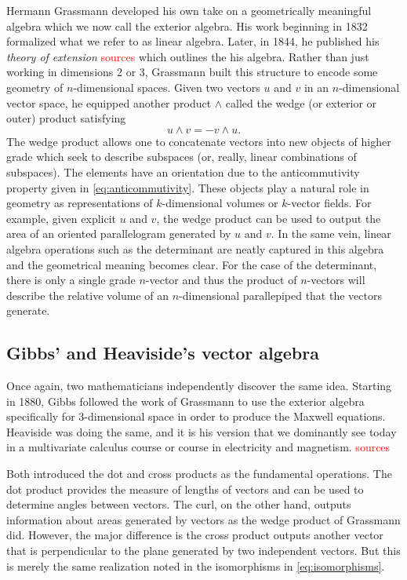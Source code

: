 \documentclass[12pt]{article}
\begin{document}
Hermann Grassmann developed his own take on a geometrically meaningful algebra which we now call the exterior algebra. His work beginning in 1832 formalized what we refer to as linear algebra. Later, in 1844, he published his \emph{theory of extension} \textcolor{red}{sources} which outlines the his algebra. Rather than just working in dimensions 2 or 3, Grassmann built this structure to encode some geometry of $n$-dimensional spaces. Given two vectors $u$ and $v$ in an $n$-dimensional vector space, he equipped another product $\wedge$ called the wedge (or exterior or outer) product satisfying
\begin{equation}
\label{eq:anticommutivity}
u \wedge v = - v \wedge u.
\end{equation}
The wedge product allows one to concatenate vectors into new objects of higher grade which seek to describe subspaces (or, really, linear combinations of subspaces). The elements have an orientation due to the anticommutivity property given in \cref{eq:anticommutivity}. These objects play a natural role in geometry as representations of $k$-dimensional volumes or $k$-vector fields. For example, given explicit $u$ and $v$, the wedge product can be used to output the area of an oriented parallelogram generated by $u$ and $v$. In the same vein, linear algebra operations such as the determinant are neatly captured in this algebra and the geometrical meaning becomes clear. For the case of the determinant, there is only a single grade $n$-vector and thus the product of $n$-vectors will describe the relative volume of an $n$-dimensional parallepiped that the vectors generate.

\subsection{Gibbs' and Heaviside's vector algebra}

Once again, two mathematicians independently discover the same idea. Starting in 1880, Gibbs followed the work of Grassmann to use the exterior algebra specifically for 3-dimensional space in order to produce the Maxwell equations. Heaviside was doing the same, and it is his version that we dominantly see today in a multivariate calculus course or course in electricity and magnetism. \textcolor{red}{sources}

Both introduced the dot and cross products as the fundamental operations. The dot product provides the measure of lengths of vectors and can be used to determine angles between vectors. The curl, on the other hand, outputs information about areas generated by vectors as the wedge product of Grassmann did. However, the major difference is the cross product outputs another vector that is perpendicular to the plane generated by two independent vectors. But this is merely the same realization noted in the isomorphisms in \cref{eq:isomorphisms}.
\end{document}
